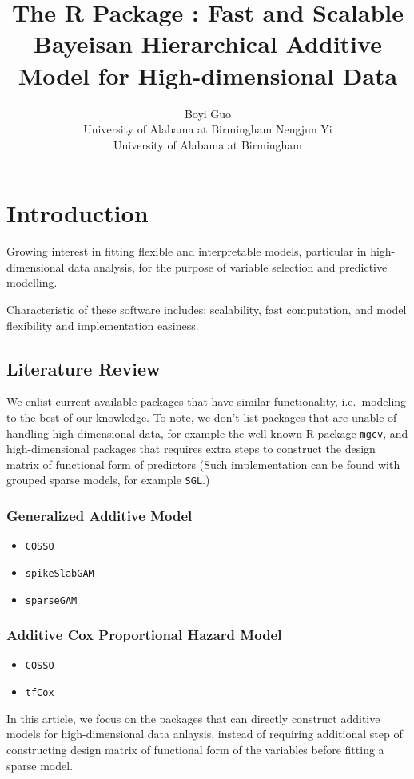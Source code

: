 \documentclass[
]{jss}
\author{
Boyi Guo\\University of Alabama at Birmingham \And Nengjun
Yi\\University of Alabama at Birmingham
}
\title{The R Package \pkg{BHAM}: Fast and Scalable Bayeisan Hierarchical
Additive Model for High-dimensional Data}
\begin{document}
\section{Introduction}

Growing interest in fitting flexible and interpretable models,
particular in high-dimensional data analysis, for the purpose of
variable selection and predictive modelling.

Characteristic of these software includes: scalability, fast
computation, and model flexibility and implementation easiness.

\subsection{Literature Review}

We enlist current available packages that have similar functionality,
i.e.~modeling to the best of our knowledge. To note, we don't list
packages that are unable of handling high-dimensional data, for example
the well known R package \texttt{mgcv}, and high-dimensional packages
that requires extra steps to construct the design matrix of functional
form of predictors (Such implementation can be found with grouped sparse
models, for example \texttt{SGL}.)

\subsubsection{Generalized Additive Model}
\begin{itemize}
\item \texttt{COSSO}
\item \texttt{spikeSlabGAM}
\item \texttt{sparseGAM}
\end{itemize}

\subsubsection{Additive Cox Proportional Hazard Model}
\begin{itemize}
\item \texttt{COSSO}
\item \texttt{tfCox}
\end{itemize}

In this article, we focus on the packages that can directly construct
additive models for high-dimensional data anlaysis, instead of requiring
additional step of constructing design matrix of functional form of the
variables before fitting a sparse model.
\end{document}
